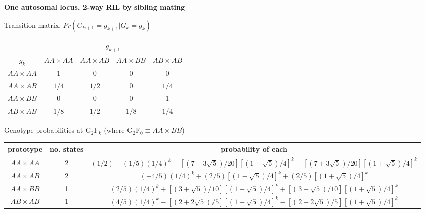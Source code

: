 \documentclass[12pt]{article}
\begin{document}
\textbf{\sffamily One autosomal locus, 2-way RIL by sibling mating}
\bigskip

\begin{center}
Transition matrix, $Pr(G_{k+1}=g_{k+1} | G_k = g_k)$ \\[6pt]
\renewcommand{\arraystretch}{1.5}\begin{tabular}{ccccc} \hline
& \multicolumn{4}{c}{$g_{k+1}$} \\ \cline{2-5}
$g_k$ & $AA \times AA$ & $AA \times AB$ & $AA \times BB$ & $AB \times AB$  \\ \hline 
$AA \times AA$ & $1$ & $0$ & $0$ & $0$ \\ 
$AA \times AB$ & $1/4$ & $1/2$ & $0$ & $1/4$ \\ 
$AA \times BB$ & $0$ & $0$ & $0$ & $1$ \\ 
$AB \times AB$ & $1/8$ & $1/2$ & $1/8$ & $1/4$ \\ 
\hline
\end{tabular}
\end{center}

\clearpage
\begin{center}
Genotype probabilities at $\text{G}_2\text{F}_k$ (where $\text{G}_2\text{F}_0 \equiv AA \times BB$)\\[6pt]
\renewcommand{\arraystretch}{1.5}\begin{tabular}{ccc}\hline
prototype & no. states & probability of each \\ \hline
$AA \times AA$ & 2 & $(1/2) + (1/5)(1/4)^k - [(7-3\sqrt{5})/20][(1-\sqrt{5})/4]^k - [(7+3\sqrt{5})/20][(1+\sqrt{5})/4]^k$ \\ 
$AA \times AB$ & 2 & $(-4/5)(1/4)^k + (2/5)[(1-\sqrt{5})/4]^k + (2/5)[(1+\sqrt{5})/4]^k$ \\ 
$AA \times BB$ & 1 & $(2/5)(1/4)^k + [(3+\sqrt{5})/10][(1-\sqrt{5})/4]^k + [(3-\sqrt{5})/10][(1+\sqrt{5})/4]^k$ \\ 
$AB \times AB$ & 1 & $(4/5)(1/4)^k - [(2 + 2\sqrt{5})/5][(1-\sqrt{5})/4]^k - [(2-2\sqrt{5})/5][(1+\sqrt{5})/4]^k$ \\ 
\hline
\end{tabular}
\end{center}
\end{document}
